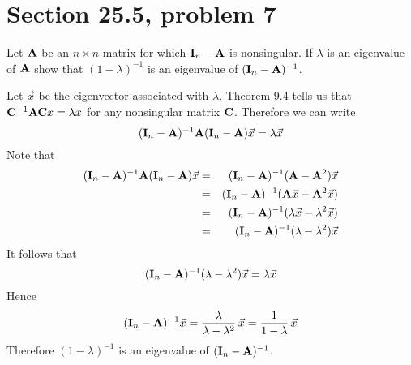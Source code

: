 \section{Section 25.5, problem 7}
Let $\bf A$ be an $n\times n$ matrix for which ${\bf I}_n-{\bf A}$
is nonsingular.
If $\lambda$ is an eigenvalue of $\bf A$ show that $(1-\lambda)^{-1}$
is an eigenvalue of $({\bf I}_n-{\bf A})^{-1}$.

\bigskip
\noindent
Let $\vec x$ be the eigenvector associated with $\lambda$.
Theorem 9.4 tells us that ${\bf C}^{-1}{\bf AC}x=\lambda x$ for any
nonsingular matrix $\bf C$. Therefore we can write
$$({\bf I}_n-{\bf A})^{-1}{\bf A}({\bf I}_n-{\bf A})\vec x
=\lambda\vec x$$
Note that
\begin{eqnarray*}
({\bf I}_n-{\bf A})^{-1}{\bf A}({\bf I}_n-{\bf A})\vec x
&=&({\bf I}_n-{\bf A})^{-1}({\bf A}-{\bf A}^2)\vec x\\
&=&({\bf I}_n-{\bf A})^{-1}({\bf A}\vec x-{\bf A}^2\vec x)\\
&=&({\bf I}_n-{\bf A})^{-1}(\lambda\vec x-\lambda^2\vec x)\\
&=&({\bf I}_n-{\bf A})^{-1}(\lambda-\lambda^2)\vec x
\end{eqnarray*}
It follows that
$$({\bf I}_n-{\bf A})^{-1}(\lambda-\lambda^2)\vec x=\lambda\vec x$$
Hence
$$({\bf I}_n-{\bf A})^{-1}\vec x
={\lambda\over\lambda-\lambda^2}\,\vec x={1\over1-\lambda}\,\vec x$$
Therefore $(1-\lambda)^{-1}$ is an eigenvalue of
$({\bf I}_n-{\bf A})^{-1}$.

